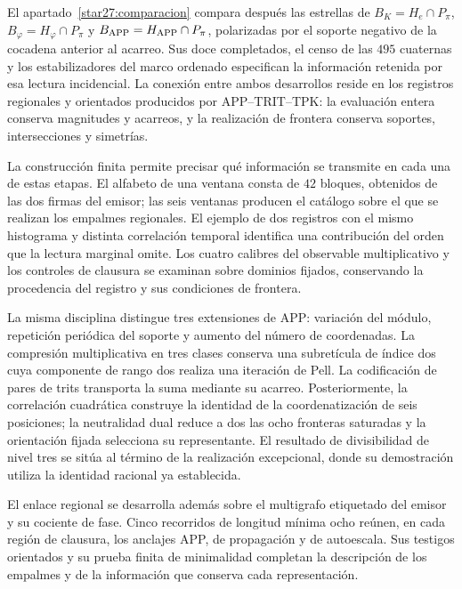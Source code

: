 El apartado~\ref{star27:comparacion} compara después las estrellas de
\(B_K=H_e\cap P_\pi\), \(B_\varphi=H_\varphi\cap P_\pi\) y
\(B_{\rm APP}=H_{\rm APP}\cap P_\pi\), polarizadas por el soporte
negativo de la cocadena anterior al acarreo. Sus doce completados,
el censo de las \(495\) cuaternas y los estabilizadores del marco
ordenado especifican la información retenida por esa lectura
incidencial. La conexión entre ambos desarrollos reside en los
registros regionales y orientados producidos por APP--TRIT--TPK:
la evaluación entera conserva magnitudes y acarreos, y la realización
de frontera conserva soportes, intersecciones y simetrías.



La construcción finita permite precisar qué información se transmite en
cada una de estas etapas. El alfabeto de una ventana consta de \(42\)
bloques, obtenidos de las dos firmas del emisor; las seis ventanas producen
el catálogo sobre el que se realizan los empalmes regionales. El ejemplo
de dos registros con el mismo histograma y distinta correlación temporal
identifica una contribución del orden que la lectura marginal omite. Los
cuatro calibres del observable multiplicativo y los controles de clausura
se examinan sobre dominios fijados, conservando la procedencia del registro
y sus condiciones de frontera.

La misma disciplina distingue tres extensiones de APP: variación del
módulo, repetición periódica del soporte y aumento del número de
coordenadas. La compresión multiplicativa en tres clases conserva una
subretícula de índice dos cuya componente de rango dos realiza una
iteración de Pell. La codificación de pares de trits transporta la suma
mediante su acarreo. Posteriormente, la correlación cuadrática construye
la identidad de la coordenatización de seis posiciones; la neutralidad dual reduce
a dos las ocho fronteras saturadas y la orientación fijada selecciona su
representante. El resultado de divisibilidad de nivel tres se sitúa al
término de la realización excepcional, donde su demostración utiliza
la identidad racional ya establecida.

El enlace regional se desarrolla además sobre el multigrafo etiquetado
del emisor y su cociente de fase. Cinco recorridos de longitud mínima
ocho reúnen, en cada región de clausura, los anclajes APP, de propagación
y de autoescala. Sus testigos orientados y su prueba finita de minimalidad
completan la descripción de los empalmes y de la información que conserva
cada representación.


